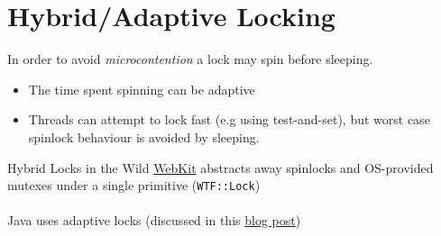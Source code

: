 \section{Hybrid/Adaptive Locking}
In order to avoid \textit{microcontention} a lock may spin before sleeping.
\begin{itemize}
	\item The time spent spinning can be adaptive
	\item Threads can attempt to lock fast (e.g using test-and-set), but worst case spinlock behaviour is avoided by sleeping.
\end{itemize}
\begin{sidenotebox}{Hybrid Locks in the Wild}
	\href{https://webkit.org/blog/6161/locking-in-webkit/}{WebKit} abstracts away spinlocks and OS-provided mutexes under a single primitive (\texttt{WTF::Lock})
	\\
	\\ Java uses adaptive locks (discussed in this \href{https://blog.openj9.org/2019/04/02/adaptive-spinning/}{blog post})
\end{sidenotebox}
